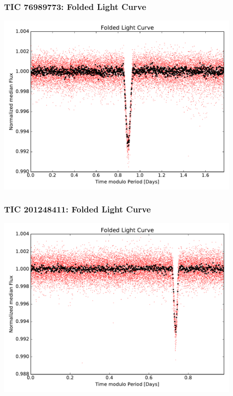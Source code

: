 \documentclass[notes]{beamer}
\begin{document}
\begin{frame}
\frametitle{TIC 76989773: Folded Light Curve}
\centering
\includegraphics[width=0.9\textwidth]{../figures/2019-1-15_16:2:14_Folded_TIC76989773.pdf}
\end{frame}

\begin{frame}
\frametitle{TIC 201248411: Folded Light Curve}
\centering
\includegraphics[width=0.9\textwidth]{../figures/2019-1-15_16:2:14_Folded_TIC201248411.pdf}
\end{frame}
\end{document}
